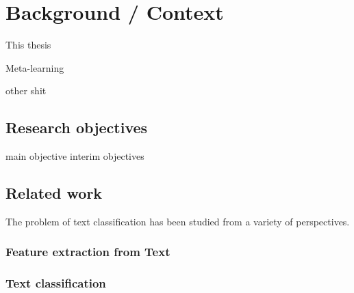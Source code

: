
\clearpage
\section{Background / Context}

This thesis

\cite{Do:2006aa}



Meta-learning

other shit


\subsection{Research objectives}



\begin{displayquote}
main objective
interim objectives
\end{displayquote}

\subsection{Related work}

The problem of text classification has been studied from a variety of perspectives.




\subsubsection{Feature extraction from Text}



\subsubsection{Text classification}
